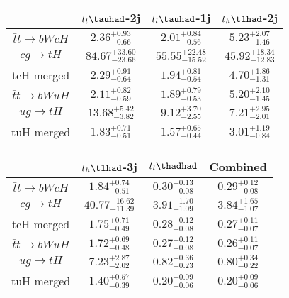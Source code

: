 \centering
\begin{tabular}{|c|c|c|c|} \hline
 & $t_l\tauhad$-2j & $t_l\tauhad$-1j & $t_h\tlhad$-2j\\\hline
$\bar{t}t\to bWcH$ & $2.36^{+0.93}_{-0.66}$ & $2.01^{+0.84}_{-0.56}$ & $5.23^{+2.07}_{-1.46}$\\\hline
$cg\to tH$ & $84.67^{+33.60}_{-23.66}$ & $55.55^{+22.48}_{-15.52}$ & $45.92^{+18.34}_{-12.83}$\\\hline
tcH merged & $2.29^{+0.91}_{-0.64}$ & $1.94^{+0.81}_{-0.54}$ & $4.70^{+1.86}_{-1.31}$\\\hline
$\bar{t}t\to bWuH$ & $2.11^{+0.82}_{-0.59}$ & $1.89^{+0.79}_{-0.53}$ & $5.20^{+2.10}_{-1.45}$\\\hline
$ug\to tH$ & $13.68^{+5.42}_{-3.82}$ & $9.12^{+3.70}_{-2.55}$ & $7.21^{+2.95}_{-2.01}$\\\hline
tuH merged & $1.83^{+0.71}_{-0.51}$ & $1.57^{+0.65}_{-0.44}$ & $3.01^{+1.19}_{-0.84}$\\\hline
\end{tabular}
\begin{tabular}{|c|c|c|c|} \hline
 & $t_h\tlhad$-3j & $t_l\thadhad$ & Combined\\\hline
$\bar{t}t\to bWcH$ & $1.84^{+0.74}_{-0.51}$ & $0.30^{+0.13}_{-0.08}$ & $0.29^{+0.12}_{-0.08}$\\\hline
$cg\to tH$ & $40.77^{+16.62}_{-11.39}$ & $3.91^{+1.70}_{-1.09}$ & $3.84^{+1.65}_{-1.07}$\\\hline
tcH merged & $1.75^{+0.71}_{-0.49}$ & $0.28^{+0.12}_{-0.08}$ & $0.27^{+0.11}_{-0.07}$\\\hline
$\bar{t}t\to bWuH$ & $1.72^{+0.69}_{-0.48}$ & $0.27^{+0.12}_{-0.08}$ & $0.26^{+0.11}_{-0.07}$\\\hline
$ug\to tH$ & $7.23^{+2.87}_{-2.02}$ & $0.82^{+0.36}_{-0.23}$ & $0.80^{+0.34}_{-0.22}$\\\hline
tuH merged & $1.40^{+0.57}_{-0.39}$ & $0.20^{+0.09}_{-0.06}$ & $0.20^{+0.09}_{-0.06}$\\\hline
\end{tabular}
